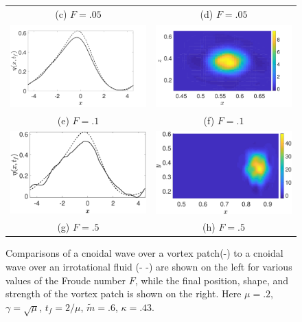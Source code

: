 \documentclass[a4paper,11pt]{article}
\begin{document}
\begin{figure}
\begin{tabular}{cc}
(c)  $F=.05$ & (d)  $F=.05$\\
\includegraphics[width=.35\textwidth]{profiles_wm_10_modu_pt6} & \includegraphics[width=.35\textwidth]{vorticity_wm_10_modu_pt6}\\
(e)  $F=.1$ & (f)  $F=.1$\\
\includegraphics[width=.35\textwidth]{profiles_wm_50_modu_pt6} & \includegraphics[width=.35\textwidth]{vorticity_wm_50_modu_pt6}\\
(g)  $F=.5$ & (h)  $F=.5$
\end{tabular}
\caption{Comparisons of a cnoidal wave over a vortex patch(-) to a cnoidal wave over an irrotational fluid (- -) are shown on the left for various values of the Froude number $F$, while the final position, shape, and strength of the vortex patch is shown on the right.  Here $\mu=.2$, $\gamma=\sqrt{\mu}$, $t_{f}=2/\mu$, $\tilde{m}=.6$, $\kappa = .43$.}
\label{fig:midsolwave}
\end{figure}
\end{document}

